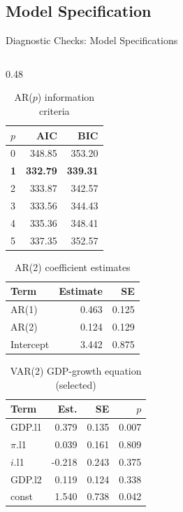 \documentclass[9pt]{beamer}
\begin{document}
\subsection{Model Specification}
\begin{frame}{Diagnostic Checks: Model Specifications}
\small

\begin{columns}
  \begin{column}{0.48\textwidth}
\vspace{-0.2cm}
    \begin{table}[ht]
    \tiny
    \centering
    \caption{\footnotesize AR($p$) information criteria}
    \begin{tabular}{lrr}
    \toprule
    $p$ & AIC & BIC \\
    \midrule
    0 & 348.85 & 353.20 \\
    \textbf{1} & \textbf{332.79} & \textbf{339.31} \\
    2 & 333.87 & 342.57 \\
    3 & 333.56 & 344.43 \\
    4 & 335.36 & 348.41 \\
    5 & 337.35 & 352.57 \\
    \bottomrule
    \end{tabular}
    \end{table}
\vspace{-0.3cm}
    \begin{table}[ht]
    \tiny
    \centering
    \caption{\footnotesize AR(2) coefficient estimates}
    \begin{tabular}{lrr}
    \toprule
    Term & Estimate & SE \\
    \midrule
    AR(1)     & 0.463 & 0.125 \\
    AR(2)     & 0.124 & 0.129 \\
    Intercept & 3.442 & 0.875 \\
    \bottomrule
    \end{tabular}
    \end{table}
\vspace{-0.3cm}
    \begin{table}[ht]
    \tiny
    \centering
    \caption{\footnotesize VAR(2) GDP-growth equation (selected)}
    \begin{tabular}{lrrr}
    \toprule
    Term & Est. & SE & $p$ \\
    \midrule
    GDP.l1   &  0.379 & 0.135 & 0.007 \\
    $\pi$.l1 &  0.039 & 0.161 & 0.809 \\
    $i$.l1   & -0.218 & 0.243 & 0.375 \\
    GDP.l2   &  0.119 & 0.124 & 0.338 \\
    const    &  1.540 & 0.738 & 0.042 \\
    \bottomrule
    \end{tabular}
    \end{table}
  \end{column}


\end{columns}
\end{frame}
\end{document}
